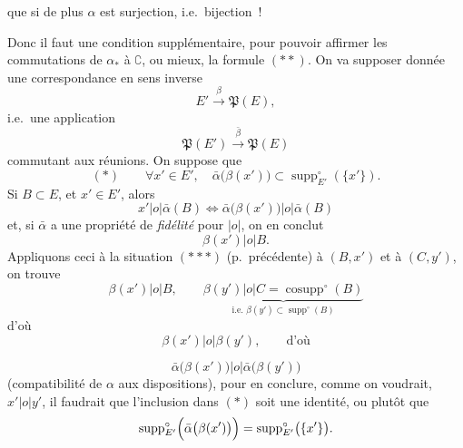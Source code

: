 \documentclass[11pt,a4paper]{article}
\begin{document}
que si de plus $\alpha$ est surjection, i.e.\ bijection~!

Donc il faut une condition supplémentaire, pour pouvoir affirmer les commutations de $\alpha_{*}$ à $\complement$, ou mieux, la formule $(**)$. On va supposer donnée une correspondance en sens inverse
\[ E' \xrightarrow{\ \beta\ } \mathfrak{P}(E), \]
i.e.\ une application
\[ \mathfrak{P}(E') \xrightarrow{\ \bar\beta\ } \mathfrak{P}(E) \]
commutant aux réunions. On suppose que
\[ (*) \qquad \forall x' \in E', \quad \bar\alpha\bigl(\beta(x')\bigr) \subset \operatorname{supp}^{\circ}_{E'}(\{x'\}). \]
Si $B \subset E$,  et $x' \in E'$, alors
\[ x' \mathrel{|o|} \bar\alpha(B) \Longleftrightarrow \bar\alpha\bigl(\beta(x')\bigr) \mathrel{|o|} \bar\alpha(B) \]
et, si $\bar\alpha$ a une propriété de \emph{fidélité} pour $|o|$, on en conclut
\[ \beta(x') \mathrel{|o|} B. \]
Appliquons ceci à la situation $(***)$ (p.\ précédente) à $(B, x')$ et à $(C, y')$, on trouve
\[ \beta(x') \mathrel{|o|} B, \qquad \underbrace{\beta(y') \mathrel{|o|} C = \operatorname{cosupp}^{\circ}(B)}_{\text{i.e. } \beta(y') \subset \operatorname{supp}^{\circ}(B)} \]
d'où
\[ \beta(x') \mathrel{|o|} \beta(y'), \qquad \text{d'où} \]

\[ \bar\alpha\bigl(\beta(x')\bigr) \mathrel{|o|} \bar\alpha\bigl(\beta(y')\bigr) \]
(compatibilité de $\alpha$ aux dispositions), pour en conclure, comme on voudrait, $x' \mathrel{|o|} y'$, il faudrait que l'inclusion dans $(*)$ soit une identité, ou plutôt que
\[ \operatorname{supp}^{\circ}_{E'}\Bigl(\bar\alpha\bigl(\beta(x')\bigr)\Bigr) = \operatorname{supp}^{\circ}_{E'}\bigl(\{x'\}\bigr). \]
\end{document}
